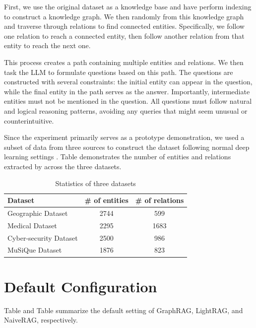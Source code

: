 First, we use the original dataset as a knowledge base and have \rag perform indexing to construct a knowledge graph. We then randomly  from this knowledge graph and traverse through relations to find connected entities. Specifically, we follow one relation to reach a connected entity, then follow another relation from that entity to reach the next one.

This process creates a path containing multiple entities and relations. We then task the LLM to formulate questions based on this path. The questions are constructed with several constraints: the initial entity can appear in the question, while the final entity in the path serves as the answer. Importantly, intermediate entities must not be mentioned in the question. All questions must follow natural and logical reasoning patterns, avoiding any queries that might seem unusual or counterintuitive.





Since the experiment primarily serves as a prototype demonstration, we used a subset of data from three sources to construct the dataset following normal deep learning settings . Table demonstrates the number of entities and relations extracted by \rag across the three datasets.

\begin{table}[!ht]
\centering

\caption{Statistics of three datasets}
\label{tbl:3dataset}
  \small
  \def\arraystretch{1.2}
  \setlength{\tabcolsep}{3pt}
\begin{tabular}{lcc}
\toprule
Dataset & \# of entities &  \# of relations  \\ \hline
Geographic Dataset          &2744   &  599    \\ 
Medical Dataset             &2295 &   1683    \\ 
Cyber-security Dataset &2500 & 986 \\ 
MuSiQue Dataset &1876 & 823 \\ \bottomrule
\end{tabular}
\end{table}




\section{Default Configuration}
\label{sec:default_para_graphrag}
Table and Table summarize the default setting of GraphRAG, LightRAG, and NaiveRAG, respectively. 

